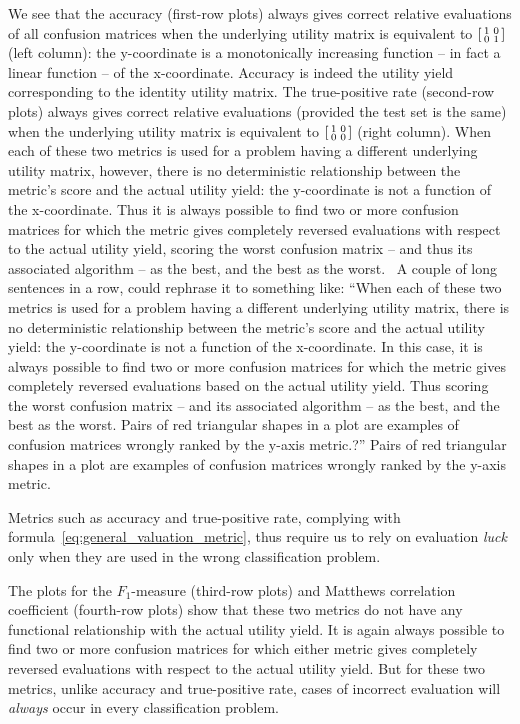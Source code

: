\documentclass[\ifafour a4paper,12pt,\else a5paper,10pt,\fi%
onecolumn,oneside,article,%
british%
]{memoir}
\theoremstyle{remark}
\theoremstyle{innote}
\newcommand*{\wrench}{{\fontencoding{U}\fontfamily{fontawesomethree}\selectfont\symbol{114}}}
\newcommand{\mynotew}[1]{{\footnotesize\color{notecolour}\wrench\ #1}}
\renewcommand*{\|}[1][]{\nonscript\:#1\vert\nonscript\:\mathopen{}}
\begin{document}
We see that the accuracy (first-row plots) always gives correct relative evaluations of all confusion matrices when the underlying utility matrix is equivalent to $\begin{bsmallmatrix} 1&0\\0&1 \end{bsmallmatrix}$ (left column): the y-coordinate is a monotonically increasing function -- in fact a linear function -- of the x-coordinate. Accuracy is indeed the utility yield corresponding to the identity utility matrix. The true-positive rate (second-row plots) always gives correct relative evaluations (provided the test set is the same) when the underlying utility matrix is equivalent to $\begin{bsmallmatrix} 1&0\\0&0 \end{bsmallmatrix}$ (right column). When each of these two metrics is used for a problem having a different underlying utility matrix, however, there is no deterministic relationship between the metric's score and the actual utility yield: the y-coordinate is not a function of the x-coordinate. Thus it is always possible to find two or more confusion matrices for which the metric gives completely reversed evaluations with respect to the actual utility yield, scoring the worst confusion matrix -- and thus its associated algorithm -- as the best, and the best as the worst. \mynotew{A couple of long sentences in a row, could rephrase it to something like: \enquote{When each
of these two metrics is used for a problem having a different underlying
utility matrix, there is no deterministic relationship between
the metric’s score and the actual utility yield: the y-coordinate is not a
function of the x-coordinate. In this case, it is always possible to find two or more confusion matrices for which the metric gives completely reversed
evaluations based on the actual utility yield. Thus scoring the worst
confusion matrix – and its associated algorithm – as the best, and
the best as the worst. Pairs of red triangular shapes in a plot are examples
of confusion matrices wrongly ranked by the y-axis metric.?} } Pairs of red triangular shapes in a plot are examples of confusion matrices wrongly ranked by the y-axis metric.

Metrics such as accuracy and true-positive rate, complying with formula~\eqref{eq:general_valuation_metric}, thus require us to rely on evaluation \emph{luck} only when they are used in the wrong classification problem.

The plots for the $F_{1}$-measure (third-row plots) and Matthews correlation coefficient (fourth-row plots) show that these two metrics do not have any functional relationship with the actual utility yield. It is again always possible to find two or more confusion matrices for which either metric gives completely reversed evaluations with respect to the actual utility yield. But for these two metrics, unlike accuracy and true-positive rate, cases of incorrect evaluation will \emph{always} occur in every classification problem.
\end{document}
